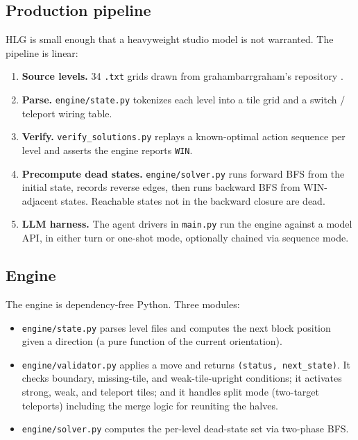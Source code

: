 \subsection{Production pipeline}

HLG is small enough that a heavyweight studio model is not warranted. The pipeline is
linear:

\begin{enumerate}[leftmargin=1.5em]
    \item \textbf{Source levels.} 34 \texttt{.txt} grids drawn from
      grahambarrgraham's repository \cite{grahambarrgrahambloxorz}.
    \item \textbf{Parse.} \texttt{engine/state.py} tokenizes each level into a tile
      grid and a switch / teleport wiring table.
    \item \textbf{Verify.} \texttt{verify\_solutions.py} replays a known-optimal
      action sequence per level and asserts the engine reports \texttt{WIN}.
    \item \textbf{Precompute dead states.} \texttt{engine/solver.py} runs forward BFS
      from the initial state, records reverse edges, then runs backward BFS from
      WIN-adjacent states. Reachable states not in the backward closure are dead.
    \item \textbf{LLM harness.} The agent drivers in \texttt{main.py} run the engine
      against a model API, in either turn or one-shot mode, optionally chained via
      sequence mode.
\end{enumerate}

\subsection{Engine}

The engine is dependency-free Python. Three modules:
\begin{itemize}[leftmargin=1.5em]
    \item \texttt{engine/state.py} parses level files and computes the next block
      position given a direction (a pure function of the current orientation).
    \item \texttt{engine/validator.py} applies a move and returns
      \texttt{(status, next\_state)}. It checks boundary, missing-tile, and
      weak-tile-upright conditions; it activates strong, weak, and teleport tiles; and it
      handles split mode (two-target teleports) including the merge logic for
      reuniting the halves.
    \item \texttt{engine/solver.py} computes the per-level dead-state set via
      two-phase BFS.
\end{itemize}

